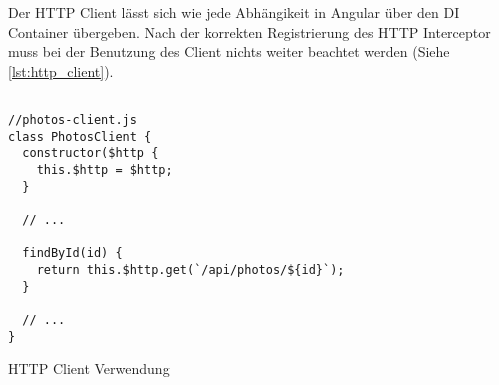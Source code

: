 Der HTTP Client lässt sich wie jede Abhängikeit in Angular über den DI Container übergeben. Nach der korrekten Registrierung des HTTP Interceptor muss bei der Benutzung des Client nichts weiter beachtet werden (Siehe \ref{lst:http_client}).

\begin{listing}[H]
\begin{verbatim}

//photos-client.js
class PhotosClient {
  constructor($http {
    this.$http = $http;
  }

  // ...

  findById(id) {
    return this.$http.get(`/api/photos/${id}`);
  }

  // ...
}  

\end{verbatim}
\caption{HTTP Client Verwendung}
\label{lst:http_clientseitigen}
\end{listing}

